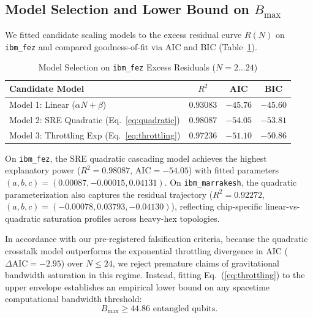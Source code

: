 \documentclass[11pt,a4paper,twocolumn]{article}
\begin{document}
\subsection{Model Selection and Lower Bound on $B_{\max}$}
We fitted candidate scaling models to the excess residual curve $R(N)$ on \texttt{ibm\_fez} and compared goodness-of-fit via AIC and BIC (Table~\ref{tab:models}).

\begin{table}[h]
\centering
\caption{Model Selection on \texttt{ibm\_fez} Excess Residuals ($N=2\dots 24$)}
\label{tab:models}
\small
\begin{tabular}{lccc}
\toprule
\textbf{Candidate Model} & $R^2$ & \textbf{AIC} & \textbf{BIC} \\
\midrule
Model 1: Linear ($\alpha N + \beta$) & $0.93083$ & $-45.76$ & $-45.60$ \\
Model 2: SRE Quadratic (Eq.~\ref{eq:quadratic}) & $\mathbf{0.98087}$ & $\mathbf{-54.05}$ & $\mathbf{-53.81}$ \\
Model 3: Throttling Exp (Eq.~\ref{eq:throttling}) & $0.97236$ & $-51.10$ & $-50.86$ \\
\bottomrule
\end{tabular}
\end{table}

On \texttt{ibm\_fez}, the SRE quadratic cascading model achieves the highest explanatory power ($R^2 = 0.98087$, $\text{AIC} = -54.05$) with fitted parameters $(a, b, c) = (0.00087, -0.00015, 0.04131)$. On \texttt{ibm\_marrakesh}, the quadratic parameterization also captures the residual trajectory ($R^2 = 0.92272$, $(a, b, c) = (-0.00078, 0.03793, -0.04130)$), reflecting chip-specific linear-vs-quadratic saturation profiles across heavy-hex topologies.

In accordance with our pre-registered falsification criteria, because the quadratic crosstalk model outperforms the exponential throttling divergence in AIC ($\Delta\text{AIC} = -2.95$) over $N \le 24$, we reject premature claims of gravitational bandwidth saturation in this regime. Instead, fitting Eq.~(\ref{eq:throttling}) to the upper envelope establishes an empirical lower bound on any spacetime computational bandwidth threshold:
\begin{equation}
    B_{\max} \ge 44.86\text{ entangled qubits}.
\end{equation}
\end{document}
